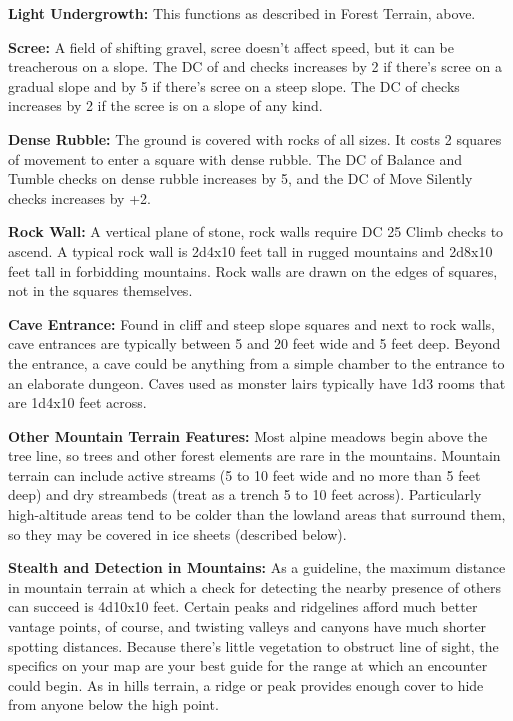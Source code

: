 \textbf{Light Undergrowth:} This functions as described in Forest Terrain, above.

\textbf{Scree:} A field of shifting gravel, scree doesn't affect speed, but it 
can be treacherous on a slope. The DC of  and  checks increases by 
2 if there's scree on a gradual slope and by 5 if there's scree on a steep slope. 
The DC of  checks increases by 2 if the scree is on a slope of any 
kind.

\textbf{Dense Rubble:} The ground is covered with rocks of all sizes. It costs 
2 squares of movement to enter a square with dense rubble. The DC of Balance and 
Tumble checks on dense rubble increases by 5, and the DC of Move Silently checks 
increases by +2. 

\textbf{Rock Wall:} A vertical plane of stone, rock walls require DC 25 Climb checks 
to ascend. A typical rock wall is 2d4x10 feet tall in rugged 
mountains and 2d8x10 feet tall in forbidding mountains. Rock 
walls are drawn on the edges of squares, not in the squares themselves.

\textbf{Cave Entrance:} Found in cliff and steep slope squares and next to rock 
walls, cave entrances are typically between 5 and 20 feet wide and 5 feet deep. 
Beyond the entrance, a cave could be anything from a simple chamber to the entrance 
to an elaborate dungeon. Caves used as monster lairs typically have 1d3 rooms that 
are 1d4x10 feet across. 

\textbf{Other Mountain Terrain Features:} Most alpine meadows begin above the tree 
line, so trees and other forest elements are rare in the mountains. Mountain terrain 
can include active streams (5 to 10 feet wide and no more than 5 feet deep) and 
dry streambeds (treat as a trench 5 to 10 feet across). Particularly high-altitude 
areas tend to be colder than the lowland areas that surround them, so they may 
be covered in ice sheets (described below).

\textbf{Stealth and Detection in Mountains:} As a guideline, the maximum distance 
in mountain terrain at which a  check for detecting the nearby presence of 
others can succeed is 4d10x10 feet. Certain peaks and ridgelines 
afford much better vantage points, of course, and twisting valleys and canyons 
have much shorter spotting distances. Because there's little vegetation to obstruct 
line of sight, the specifics on your map are your best guide for the range at which 
an encounter could begin. As in hills terrain, a ridge or peak provides enough 
cover to hide from anyone below the high point.


